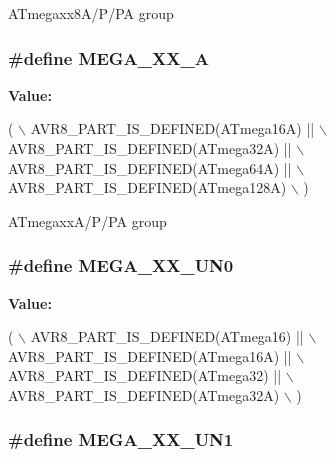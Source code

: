 A\-Tmegaxx8\-A/\-P/\-P\-A group \hypertarget{group__mega__part__macros__group_ga2b23bf35c1439ec05ddac769a8d8d1f8}{
\subsubsection[{M\-E\-G\-A\-\_\-\-X\-X\-\_\-\-A}]{\setlength{\rightskip}{0pt plus 5cm}\#define M\-E\-G\-A\-\_\-\-X\-X\-\_\-\-A}}\label{group__mega__part__macros__group_ga2b23bf35c1439ec05ddac769a8d8d1f8}
{\bfseries Value\-:}
\begin{DoxyCode}
( \(\backslash\)
        AVR8\_PART\_IS\_DEFINED(ATmega16A)  || \(\backslash\)
        AVR8\_PART\_IS\_DEFINED(ATmega32A)  || \(\backslash\)
        AVR8\_PART\_IS\_DEFINED(ATmega64A)  || \(\backslash\)
        AVR8\_PART\_IS\_DEFINED(ATmega128A) \(\backslash\)
        )
\end{DoxyCode}
A\-Tmegaxx\-A/\-P/\-P\-A group \hypertarget{group__mega__part__macros__group_gae1703e1537f2cbb10b4a8992c8b7b70b}{
\subsubsection[{M\-E\-G\-A\-\_\-\-X\-X\-\_\-\-U\-N0}]{\setlength{\rightskip}{0pt plus 5cm}\#define M\-E\-G\-A\-\_\-\-X\-X\-\_\-\-U\-N0}}\label{group__mega__part__macros__group_gae1703e1537f2cbb10b4a8992c8b7b70b}
{\bfseries Value\-:}
\begin{DoxyCode}
( \(\backslash\)
        AVR8\_PART\_IS\_DEFINED(ATmega16)    || \(\backslash\)
        AVR8\_PART\_IS\_DEFINED(ATmega16A)   || \(\backslash\)
        AVR8\_PART\_IS\_DEFINED(ATmega32)    || \(\backslash\)
        AVR8\_PART\_IS\_DEFINED(ATmega32A) \(\backslash\)
        )
\end{DoxyCode}
\hypertarget{group__mega__part__macros__group_gaad35e34280ef078dec0cc18c3ea6d3f6}{
\subsubsection[{M\-E\-G\-A\-\_\-\-X\-X\-\_\-\-U\-N1}]{\setlength{\rightskip}{0pt plus 5cm}\#define M\-E\-G\-A\-\_\-\-X\-X\-\_\-\-U\-N1}}\label{group__mega__part__macros__group_gaad35e34280ef078dec0cc18c3ea6d3f6}
